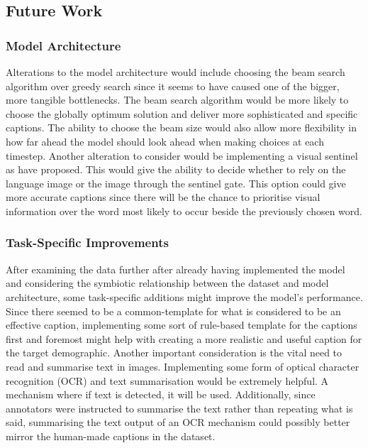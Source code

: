 \documentclass[11pt,a4paper]{article}
\begin{document}
\subsection{Future Work}
\label{ssec:futurework}

\subsubsection{Model Architecture}
\label{sssec:modarch}
Alterations to the model architecture would include choosing the beam search algorithm over greedy search since it seems to have caused one of the bigger, more tangible bottlenecks. The beam search algorithm would be more likely to choose the globally optimum solution and deliver more sophisticated and specific captions. The ability to choose the beam size would also allow more flexibility in how far ahead the model should look ahead when making choices at each timestep. Another alteration to consider would be implementing a visual sentinel as \citet{Lu-whentolook} have proposed. This would give the ability to decide whether to rely on the language image or the image through the sentinel gate. This option could give more accurate captions since there will be the chance to prioritise visual information over the word most likely to occur beside the previously chosen word.

\subsubsection{Task-Specific Improvements}
After examining the data further after already having implemented the model and considering the symbiotic relationship between the dataset and model architecture, some task-specific additions might improve the model’s performance. Since there seemed to be a common-template for what is considered to be an effective caption, implementing some sort of rule-based template for the captions first and foremost might help with creating a more realistic and useful caption for the target demographic. Another important consideration is the vital need to read and summarise text in images. Implementing some form of optical character recognition (OCR) and text summarisation would be extremely helpful. A mechanism where if text is detected, it will be used. Additionally, since annotators were instructed to summarise the text rather than repeating what is said, summarising the text output of an OCR mechanism could possibly better mirror the human-made captions in the dataset.



\end{document}

